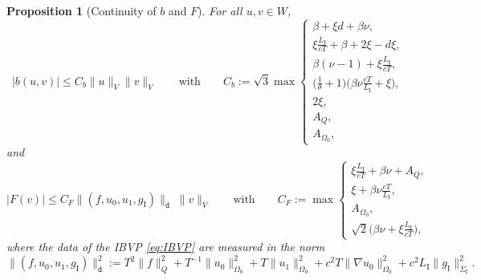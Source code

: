 \documentclass[a4paper]{article}
\theoremstyle{plain}
\newtheorem{proposition}[theorem]{Proposition}
\theoremstyle{definition}
\newcommand{\Grad}[1]{\nabla #1}
\newcommand{\LI}{L_{\mathrm I}}
\newcommand{\SI}{{\Sigma_{\mathrm I}}}
\newcommand{\gI}{{g_{\mathrm I}}}
\newcommand{\OZ}{{\Omega_0}}
\begin{document}
\begin{proposition}[Continuity of $b$ and $F$]\label{prop:continuity_b}
	For all $u,v\in W$,
\begin{equation}\label{eq:boundedness_bilinear}
		|b(u,v)| \leq C_b \|u\|_V \|v\|_V
		\qquad \text{with}\qquad
		C_b := \sqrt{3} \max
		\begin{cases}
			\beta + \xi d + \beta \nu,                                             \\
			\xi \frac{\LI}{cT} + \beta + 2 \xi - d \xi,                        \\
			\beta  (\nu-1) + \xi \frac{\LI}{cT},                               \\
			\big(\frac1\theta +1\big) \big(\beta\nu \frac{cT}{\LI} + \xi\big), \\
			2 \xi,                                                                 \\
			A_Q,                                                                   \\
			A_\OZ,
		\end{cases}
	\end{equation}
	and
	\begin{equation*}
|F(v)|\leq C_F \|(f, u_0, u_1, \gI)\|_{\mathtt{d}}\;\|v\|_V
\qquad \text{with}\qquad
C_F:=\max
\begin{cases}
		\xi \frac{\LI}{c T}+ \beta \nu + A_Q,\\
		\xi + \beta \nu \frac{c T}{\LI},\\
		A_\OZ,\\
		\sqrt2 \Big(\beta \nu + \xi\frac{\LI}{cT}\Big),
\end{cases}
	\end{equation*}
	where the data of the IBVP \eqref{eq:IBVP} are measured in the norm
	\begin{equation}\label{eq:dnorm}
		\|(f, u_0, u_1, \gI)\|_{\mathtt{d}}^2
		:= T^2 \|f\|_Q^2  + T^{-1} \|u_0\|_\OZ^2 + T\|u_1\|_\OZ^2 + c^2T\|\Grad u_0\|_\OZ^2+ c^2\LI\|\gI\|_\SI^2.
	\end{equation}
\end{proposition}
\end{document}
